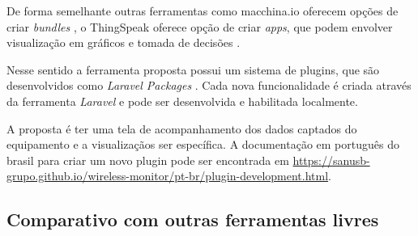De forma semelhante outras ferramentas como macchina.io oferecem opções
de criar \emph{bundles} \cite{macchina.io-2016}, o ThingSpeak oferece
opção de criar \emph{apps}, que podem envolver visualização em gráficos
e tomada de decisões \cite{thingspeak-2016}.

Nesse sentido a ferramenta proposta possui um sistema de plugins, que
são desenvolvidos como \emph{Laravel Packages}
\cite{laravel-packages-2016}. Cada nova funcionalidade é criada através
da ferramenta \emph{Laravel} e pode ser desenvolvida e habilitada
localmente.

A proposta é ter uma tela de acompanhamento dos dados captados do
equipamento e a visualizaçãos ser específica. A documentação em
português do brasil para criar um novo plugin pode ser encontrada em
\url{https://sanusb-grupo.github.io/wireless-monitor/pt-br/plugin-development.html}.

\subsection{Comparativo com outras ferramentas
livres}\label{comparativo-com-outras-ferramentas-livres}


